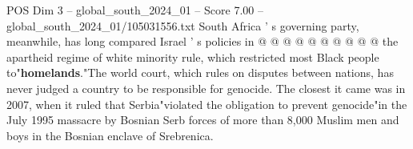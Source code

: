 \begin{textsample}{POS Dim 3 – global\_south\_2024\_01 – Score 7.00 – global\_south\_2024\_01/105031556.txt}
South Africa ' s governing party, meanwhile, has long compared Israel ' s policies in @ @ @ @ @ @ @ @ @ @ the apartheid regime of white minority rule, which restricted most Black people to"\textbf{homelands}."The world court, which rules on disputes between nations, has never judged a country to be responsible for genocide.
The closest it came was in 2007, when it ruled that Serbia"violated the obligation to prevent genocide"in the July 1995 massacre by Bosnian Serb forces of more than 8,000 Muslim men and boys in the Bosnian enclave of Srebrenica.

\end{textsample}
